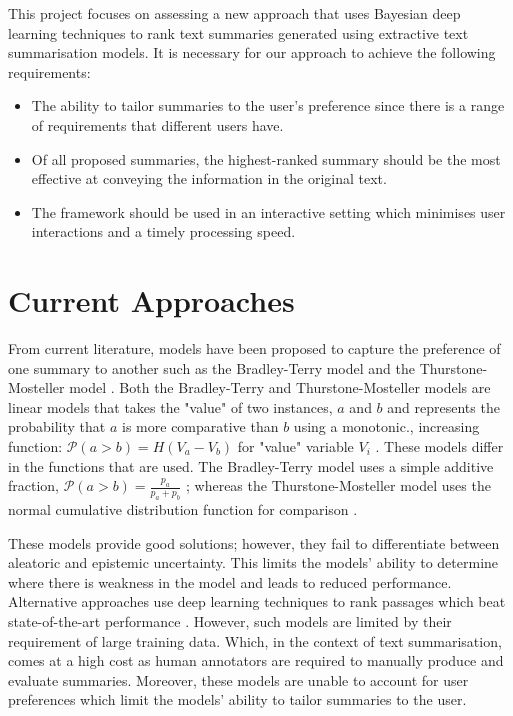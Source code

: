 \medbreak
This project focuses on assessing a new approach that uses Bayesian deep learning techniques to rank text summaries generated using extractive text summarisation models. It is necessary for our approach to achieve the following requirements:

\begin{itemize}
	\item {The ability to tailor summaries to the user’s preference since there is a range of requirements that different users have.}
	\item{Of all proposed summaries, the highest-ranked summary should be the most effective at conveying the information in the original text.}
	\item {The framework should be used in an interactive setting which minimises user interactions and a timely processing speed.}
\end{itemize}

\section{Current Approaches}
\label{chap:introduction:curr_approaches}
		
From current literature, models have been proposed to capture the preference of one summary to another such as the Bradley-Terry model \cite{Bradley52} and the Thurstone-Mosteller model \cite{Thurstone27, Mosteller51}. Both the Bradley-Terry and Thurstone-Mosteller models are linear models that takes the "value" of two instances, $a$ and $b$ and represents the probability that $a$ is more comparative than $b$ using a monotonic., increasing function: $\mathcal{P}(a > b) = H(V_a - V_b) $ for "value" variable $V_i$ \cite{Handley01}. These models differ in the functions that are used. The Bradley-Terry model uses a simple additive fraction, $\mathcal{P}(a > b) = \frac{p_a}{p_a + p_b}$ \cite{Hunter04}; whereas the Thurstone-Mosteller model uses  the normal cumulative distribution function for comparison \cite{Handley01}.
		
\medbreak
These models provide good solutions; however, they fail to differentiate between aleatoric and epistemic uncertainty. This limits the models’ ability to determine where there is weakness in the model and leads to reduced performance. Alternative approaches use deep learning techniques to rank passages which beat state-of-the-art performance \cite{Xu19}. However, such models are limited by their requirement of large training data. Which, in the context of text summarisation, comes at a high cost as human annotators are required to manually produce and evaluate summaries. Moreover, these models are unable to account for user preferences which limit the models' ability to tailor summaries to the user.
		
